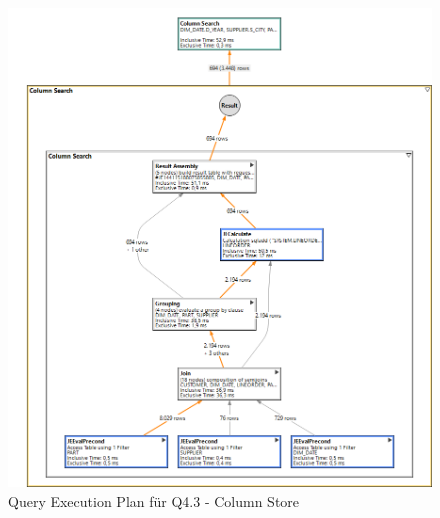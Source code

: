\begin{figure}[H]
	\centering
	\includegraphics[scale=0.35]{images/col_q43_3}
	\caption{Query Execution Plan für Q4.3 - Column Store \label{qepCol} }
\end{figure}

